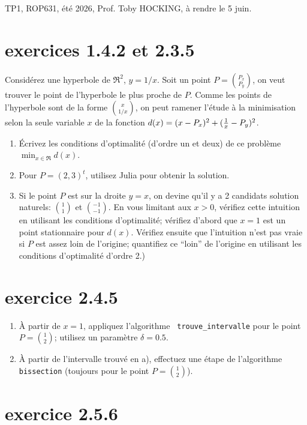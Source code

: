 \documentclass[12pt]{article}
\begin{document}
TP1, ROP631, été 2026, Prof. Toby HOCKING, à rendre le 5 juin.

\section{exercices 1.4.2 et 2.3.5}
 Consid\'erez une hyperbole de $\Re^2$, $y=1/x$. Soit un point
 $P={P_x\choose P_y}$, on veut trouver le point de l'hyperbole le plus
 proche de $P$. Comme les points de l'hyperbole sont de la forme
 ${x\choose 1/x}$, on peut ramener l'\'etude \`a la minimisation selon
 la seule variable $x$ de la fonction $d(x) = (x-P_x)^2 + ({1\over x}-P_y)^2$.
 \begin{enumerate}
 \item \'Ecrivez les conditions d'optimalit\'e (d'ordre un et deux) de ce probl\`eme
   $\min_{x\in\Re}d(x)$.
 \item Pour $P=(2,3)^t$, utilisez Julia pour obtenir la solution.
 \item Si le point $P$ est sur la droite $y=x$, on devine qu'il y a
   2 candidats solution naturels: $1\choose 1$ et $-1\choose -1$. En
   vous limitant aux $x>0$, vérifiez cette
   intuition en utilisant les conditions d'optimalité; vérifiez
   d'abord que $x=1$ est un point stationnaire pour
   $d(x)$. Vérifiez ensuite que
   l'intuition n'est pas vraie si $P$ est assez loin de l'origine;
   quantifiez ce ``loin'' de l'origine en utilisant les conditions
   d'optimalité d'ordre 2.)
 \end{enumerate}

\section{exercice 2.4.5}

\begin{enumerate}
\item \`A partir de $x=1$, appliquez l'algorithme {\tt
    trouve\_intervalle} pour le point $P={1\choose 2}$; utilisez un
  paramètre $\delta=0.5$. \label{iii}
\item \`A partir de l'intervalle trouv\'e en a), effectuez
  une \'etape de l'algorithme {\tt bissec\-tion} (toujours pour le
  point $P={1\choose 2}$). \label{iv}
\end{enumerate}

\section{exercice 2.5.6}
\end{document}
